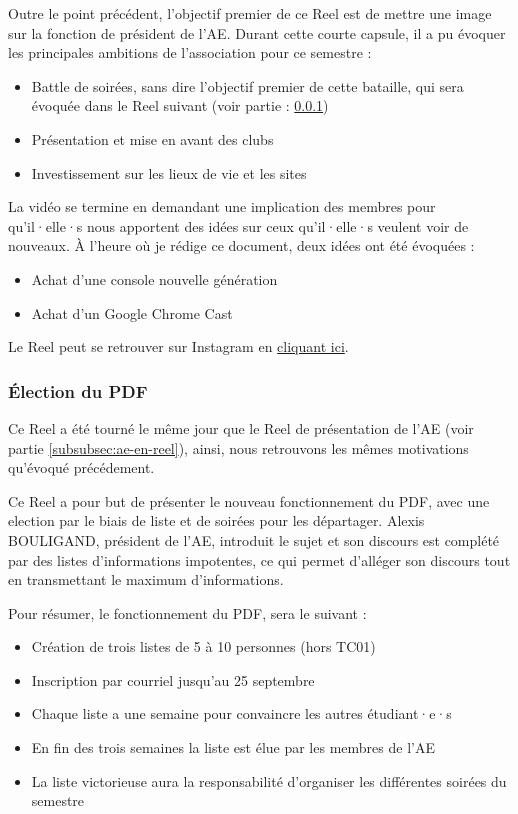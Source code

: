 Outre le point précédent, l'objectif premier de ce Reel est de mettre une image sur la fonction de président de l'\gls{AE}.
Durant cette courte capsule, il a pu évoquer les principales ambitions de l'association pour ce semestre :
\begin{itemize}
    \item Battle de soirées, sans dire l'objectif premier de cette bataille, qui sera évoquée dans le Reel suivant (voir partie : \ref{subsubsec:election-pdf})
    \item Présentation et mise en avant des clubs
    \item Investissement sur les lieux de vie et les sites
\end{itemize}


La vidéo se termine en demandant une implication des membres pour qu'il·elle·s nous apportent des idées sur ceux qu'il·elle·s veulent voir de nouveaux.
À l'heure où je rédige ce document, deux idées ont été évoquées :
\begin{itemize}
    \item Achat d'une console nouvelle génération
    \item Achat d'un Google Chrome Cast
\end{itemize}

Le Reel peut se retrouver sur Instagram en \href{https://www.instagram.com/reel/CxGShAusxDq/?utm_source=ig_web_copy_link&igshid=MzRlODBiNWFlZA==}{cliquant ici}.


\subsubsection{Élection du \gls{PDF}}\label{subsubsec:election-pdf}


Ce Reel a été tourné le même jour que le Reel de présentation de l'AE (voir partie \ref{subsubsec:ae-en-reel}), ainsi, nous retrouvons les mêmes motivations qu'évoqué précédement.

Ce Reel a pour but de présenter le nouveau fonctionnement du \gls{PDF}, avec une election par le biais de liste et de soirées pour les départager.
Alexis BOULIGAND, président de l'\gls{AE}, introduit le sujet et son discours est complété par des listes d'informations impotentes, ce qui permet d'alléger son discours tout en transmettant le maximum d'informations.

Pour résumer, le fonctionnement du \gls{PDF}, sera le suivant :
\begin{itemize}
    \item Création de trois listes de 5 à 10 personnes (hors TC01)
    \item Inscription par courriel jusqu'au 25 septembre
    \item Chaque liste a une semaine pour convaincre les autres étudiant·e·s
    \item En fin des trois semaines la liste est élue par les membres de l'\gls{AE}
    \item La liste victorieuse aura la responsabilité d'organiser les différentes soirées du semestre
\end{itemize}

